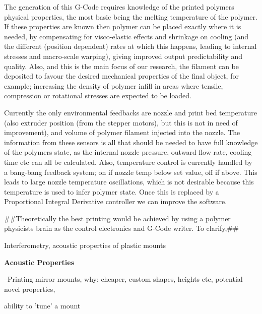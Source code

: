 \documentclass{letter}
\newcommand{\section}[1]{\medskip\bigskip

\noindent\textbf{\LARGE #1}}
\begin{document}
The generation of this G-Code requires knowledge of the printed polymers
physical properties, the most basic being the melting temperature of the
polymer. If these properties are known then polymer can be placed exactly
where it is needed, by compensating for visco-elastic effects and shrinkage on
cooling (and the different (position dependent) rates at which this happens,
leading to internal stresses and macro-scale warping), giving improved output
predictability and quality. Also, and this is the main focus of our research,
the filament can be deposited to favour the desired mechanical properties of
the final object, for example; increasing the density of polymer infill in
areas where tensile, compression or rotational stresses are expected to be
loaded.

Currently the only environmental feedbacks are nozzle and print bed
temperature (also extruder position (from the stepper motors), but this is not
in need of improvement), and volume of polymer filament injected into the
nozzle. The information from these sensors is all that should be needed to
have full knowledge of the polymers state, as the internal nozzle pressure,
outward flow rate, cooling time etc can all be calculated. Also, temperature
control is currently handled by a bang-bang feedback system; on if nozzle temp
below set value, off if above. This leads to large nozzle temperature
oscillations, which is not desirable because this temperature is used to infer
polymer state. Once this is replaced by a Proportional Integral Derivative
controller we can improve the software.

\#\#Theoretically the best printing would be achieved by using a polymer
physicists brain as the control electronics and G-Code writer. To clarify,\#\#

Interferometry, acoustic properties of plastic mounts

\section{Acoustic Properties}

--Printing mirror mounts, why; cheaper, custom shapes, heights etc, potential
novel properties,

ability to 'tune' a mount
\end{document}
